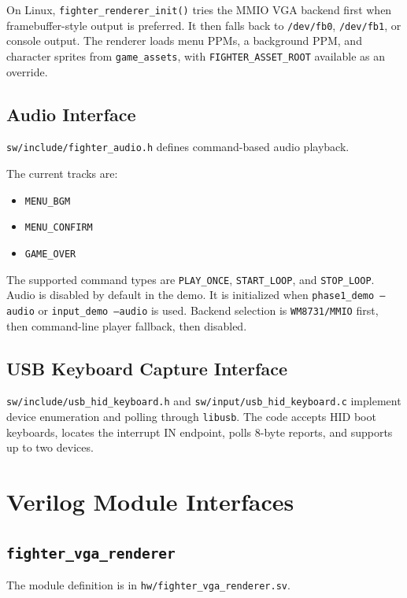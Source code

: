 \documentclass[12pt,a4paper]{article}
\begin{document}
On Linux, \texttt{fighter\_renderer\_init()} tries the MMIO VGA backend first
when framebuffer-style output is preferred. It then falls back to
\texttt{/dev/fb0}, \texttt{/dev/fb1}, or console output. The renderer loads
menu PPMs, a background PPM, and character sprites from \texttt{game\_assets},
with \texttt{FIGHTER\_ASSET\_ROOT} available as an override.

\subsection{Audio Interface}

\texttt{sw/include/fighter\_audio.h} defines command-based audio playback.

The current tracks are:

\begin{itemize}
  \item \texttt{MENU\_BGM}
  \item \texttt{MENU\_CONFIRM}
  \item \texttt{GAME\_OVER}
\end{itemize}

The supported command types are \texttt{PLAY\_ONCE}, \texttt{START\_LOOP},
and \texttt{STOP\_LOOP}. Audio is disabled by default in the demo. It is
initialized when \texttt{phase1\_demo --audio} or \texttt{input\_demo --audio}
is used. Backend selection is \texttt{WM8731/MMIO} first, then command-line
player fallback, then disabled.

\subsection{USB Keyboard Capture Interface}

\texttt{sw/include/usb\_hid\_keyboard.h} and
\texttt{sw/input/usb\_hid\_keyboard.c} implement device enumeration and polling
through \texttt{libusb}. The code accepts HID boot keyboards, locates the
interrupt IN endpoint, polls 8-byte reports, and supports up to two devices.

\section{Verilog Module Interfaces}

\subsection{\texttt{fighter\_vga\_renderer}}

The module definition is in \texttt{hw/fighter\_vga\_renderer.sv}.
\end{document}
